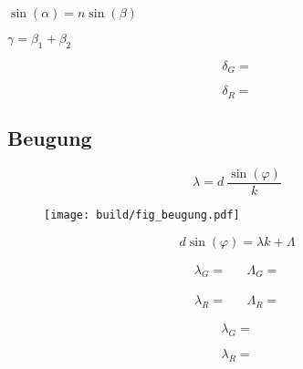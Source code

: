 $\sin(\alpha) = n \sin(\beta)$

$\gamma = \beta_1 + \beta_2$

\begin{table}[H]
	\centering
	\caption{}
	
	\label{tab:pris_g}
\end{table}

\begin{equation*}
	\delta_G = 
\end{equation*}

\begin{table}[H]
	\centering
	\caption{}
	
	\label{tab:pris_r}
\end{table}

\begin{equation*}
	\delta_R = 
\end{equation*}


\subsection{Beugung}

\begin{equation*}
	\lambda = d \: \frac{\sin(\varphi)}{k}
\end{equation*}

\begin{figure}[H]
	\texttt{[image: build/fig\_beugung.pdf]}
	\caption{}
	\label{fig:beugung}
\end{figure}

\begin{equation*}
	d \sin(\varphi) = \lambda k + \Lambda
\end{equation*}

\begin{align*}
	\lambda_G =  && \Lambda_G = 
\end{align*}

\begin{align*}
	\lambda_R =  && \Lambda_R = 
\end{align*}

\begin{table}[H]
	\centering
	\caption{}
	
	\label{tab:beugung_g}
\end{table}

\begin{equation*}
	\lambda_G = 
\end{equation*}

\begin{table}[H]
	\centering
	\caption{}
	
	\label{tab:beugung_r}
\end{table}

\begin{equation*}
	\lambda_R = 
\end{equation*}
